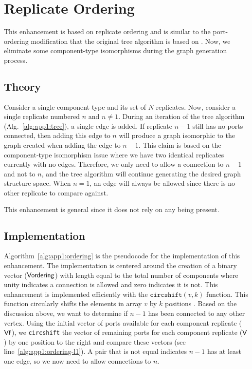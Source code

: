 \section{Replicate Ordering\label{sec:app1:ordering}}

This enhancement is based on replicate ordering and is similar to the port-ordering modification that the original tree algorithm is based on \cite{Herber2017a}. Now, we eliminate some component-type isomorphisms during the graph generation process.

\subsection{Theory}
Consider a single component type and its set of $N$ replicates.
Now, consider a single replicate numbered $n$ and $n\neq 1$.
During an iteration of the tree algorithm (Alg.~\ref{alg:app1:tree}), a single edge is added.
If replicate $n-1$ still has no ports connected, then adding this edge to $n$ will produce a graph isomorphic to the graph created when adding the edge to $n-1$.
This claim is based on the component-type isomorphism issue where we have two identical replicates currently with no edges.
Therefore, we only need to allow a connection to $n-1$ and not to $n$, and the tree algorithm will continue generating the desired graph structure space.
When $n=1$, an edge will always be allowed since there is no other replicate to compare against.

This enhancement is general since it does not rely on any  being present.

\subsection{Implementation}



Algorithm~\ref{alg:app1:ordering} is the pseudocode for the implementation of this enhancement.
The implementation is centered around the creation of a binary vector ($\textup{\textsf{Vordering}}$) with length equal to the total number of components where unity indicates a connection is allowed and zero indicates it is not. 
This enhancement is implemented efficiently with the $\texttt{circshift}(v,k)$ function.
This function circularly shifts the elements in array $v$ by $k$ positions \cite{matlab-circshift}.
Based on the discussion above, we want to determine if $n-1$ has been connected to any other vertex.
Using the initial vector of ports available for each component replicate ($\textup{\textsf{Vf}}$), we \texttt{circshift} the vector of remaining ports for each component replicate ($\textup{\textsf{V}}$) by one position to the right and compare these vectors (see line~\ref{alg:app1:ordering-l1}). 
A pair that is not equal indicates $n-1$ has at least one edge, so we now need to allow connections to $n$.

